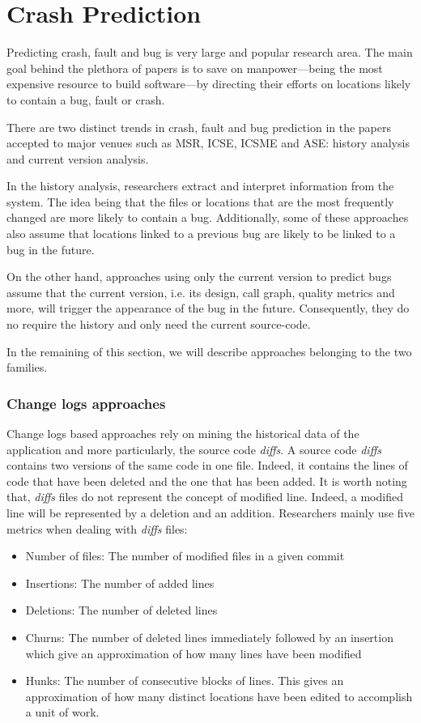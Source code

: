 \section{Crash Prediction}

Predicting crash, fault and bug is very large and popular research area.
The main goal behind the plethora of papers is to save on manpower---being the most expensive resource to build software---by directing their efforts on locations likely to contain a bug, fault or crash.

There are two distinct trends in crash, fault and bug prediction in the papers accepted to major venues such as MSR, ICSE, ICSME and ASE:  history analysis and current version analysis.

In the history analysis, researchers extract and interpret information from  the system.
The idea being that the files or locations that are the most frequently changed are more likely to contain a bug.
Additionally, some of these approaches also assume that locations linked to a previous bug are likely to be linked to a bug in the future.

On the other hand, approaches using only the current version to predict bugs assume that the current version, i.e. its design, call graph, quality metrics and more, will trigger the appearance of the bug in the future.
Consequently, they do no require the history and only need the current source-code.

In the remaining of this section, we will describe approaches belonging to the two families.

\subsubsection{Change logs approaches}
\label{subs:Change logs approaches}

Change logs based approaches rely on mining the historical data of the application and more particularly, the source code \textit{diffs}.
A source code \textit{diffs} contains two versions of the same code in one file.
Indeed, it contains the lines of code that have been deleted and the one that has been added.
It is worth noting that, \textit{diffs} files do not represent the concept of modified line.
Indeed, a modified line will be represented by a deletion and an addition.
Researchers mainly use five metrics when dealing with \textit{diffs} files:

\begin{itemize}
  \item Number of files: The number of modified files in a given commit
  \item Insertions: The number of added lines
  \item Deletions: The number of deleted lines
  \item Churns: The number of deleted lines immediately followed by an insertion which give an approximation of how many lines have been modified
  \item Hunks: The number of consecutive blocks of lines. This gives an approximation of how many distinct locations have been edited to accomplish a unit of work.
\end{itemize}

